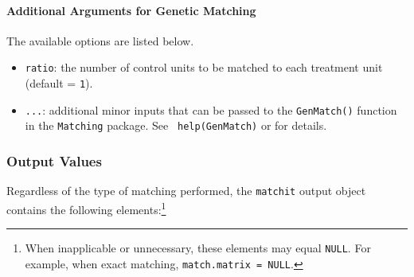 \paragraph{Additional Arguments for Genetic Matching}
\label{subsubsec:inputs-genetic}

The available options are listed below.
\begin{itemize}
\item {\tt ratio}: the number of control units to be matched to each
  treatment unit (default = {\tt 1}).
\item {\tt ...}: additional minor inputs that can be passed to the
  {\tt GenMatch()} function in the {\tt Matching} package. See {\tt
    help(GenMatch)} or
  for details.
\end{itemize}

\subsubsection{Output Values}
\label{sec:outputs}

Regardless of the type of matching performed, the \texttt{matchit}
output object contains the following elements:\footnote{When
  inapplicable or unnecessary, these elements may equal {\tt NULL}.
  For example, when exact matching, {\tt match.matrix = NULL}.}

